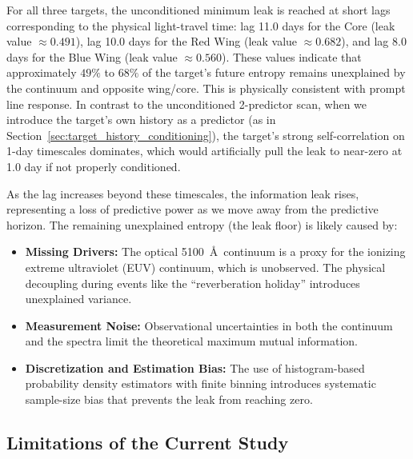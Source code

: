 \documentclass[fleqn,usenatbib]{mnras}
\begin{document}
For all three targets, the unconditioned minimum leak is reached at short lags corresponding to the physical light-travel time: lag 11.0 days for the Core (leak value $\approx 0.491$), lag 10.0 days for the Red Wing (leak value $\approx 0.682$), and lag 8.0 days for the Blue Wing (leak value $\approx 0.560$). These values indicate that approximately $49\%$ to $68\%$ of the target's future entropy remains unexplained by the continuum and opposite wing/core. This is physically consistent with prompt line response. In contrast to the unconditioned 2-predictor scan, when we introduce the target's own history as a predictor (as in Section~\ref{sec:target_history_conditioning}), the target's strong self-correlation on 1-day timescales dominates, which would artificially pull the leak to near-zero at 1.0 day if not properly conditioned.

As the lag increases beyond these timescales, the information leak rises, representing a loss of predictive power as we move away from the predictive horizon. The remaining unexplained entropy (the leak floor) is likely caused by:
\begin{itemize}
\item \textbf{Missing Drivers:} The optical 5100~\AA\ continuum is a proxy for the ionizing extreme ultraviolet (EUV) continuum, which is unobserved. The physical decoupling during events like the ``reverberation holiday'' introduces unexplained variance.
\item \textbf{Measurement Noise:} Observational uncertainties in both the continuum and the spectra limit the theoretical maximum mutual information.
\item \textbf{Discretization and Estimation Bias:} The use of histogram-based probability density estimators with finite binning introduces systematic sample-size bias that prevents the leak from reaching zero.
\end{itemize}

\subsection{Limitations of the Current Study}
\label{sec:limitations}
\end{document}
